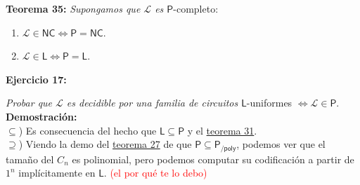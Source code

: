 \documentclass{article}
\begin{document}
\begin{flushleft}
  \textbf{Teorema 35:}
  \textit{Supongamos que $\mathcal{L}$ es $\mathsf{P}$}-completo:
\end{flushleft}
\begin{enumerate}
  \item $\mathcal{L} \in \mathsf{NC \iff P = NC}$.
  \item $\mathcal{L} \in \mathsf{L \iff P = L}$.
\end{enumerate}

\begin{flushleft}
  \hypertarget{ej17}{\textbf{Ejercicio 17:}}
  \textit{Probar que $\mathcal{L}$ es decidible por una familia de circuitos $\mathsf{L}$}-uniformes $\iff 
  \mathcal{L} \in \mathsf{P}$. \\[0.5em]

  \textbf{\textcolor{Mulberry}{Demostración:}} \\[0.5em]

  \textcolor{Mulberry}{$\subseteq$)}
  Es consecuencia del hecho que $\mathsf{L \subseteq P}$ y el \textcolor{Rhodamine}{\hyperlink{teo31}{teorema 31}}.
  \\[0.5em]

  \textcolor{Mulberry}{$\supseteq$)}
  Viendo la demo del \textcolor{Rhodamine}{\hyperlink{teo27}{teorema 27}} de que $\mathsf{P \subseteq P_{/poly}}$,
  podemos ver que el tamaño del $C_n$ es polinomial, pero podemos computar su codificación a partir de $1^n$ 
  implícitamente en $\mathsf{L}$. \textcolor{Red}{(el por qué te lo debo)}

\end{flushleft}
\end{document}

